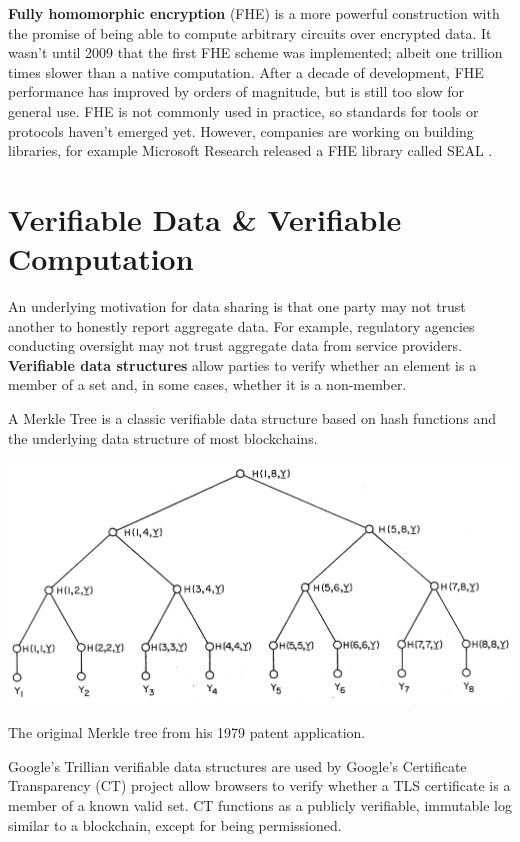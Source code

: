 \documentclass[nobib]{tufte-handout}
\begin{document}
\textbf{Fully homomorphic encryption} (FHE) is a more powerful construction with
the promise of being able to compute arbitrary circuits over encrypted data. It
wasn't until 2009 \cite{DBLP:conf/stoc/Gentry09} that the first FHE scheme was
implemented; albeit one trillion times slower than a native computation. After a
decade of development, FHE performance has improved by orders of magnitude, but
is still too slow for general use. FHE is not commonly used in practice, so
standards for tools or protocols haven't emerged yet. However, companies
are working on building libraries, for example Microsoft Research released a FHE library
called SEAL \cite{sealcrypto}.

\section{Verifiable Data \& Verifiable Computation}
\label{verifiable}

An underlying motivation for data sharing is that one party may not trust
another to honestly report aggregate data. For example, regulatory agencies
conducting oversight may not trust aggregate data from service providers.
\textbf{Verifiable data structures} allow parties to verify whether an element
is a member of a set and, in some cases, whether it is a non-member.

A Merkle Tree \cite{merkle1979} is a classic verifiable data structure based on
hash functions and the underlying data structure of most blockchains.

\begin{marginfigure} \includegraphics[width=\linewidth]{merkle} \caption{The
original Merkle tree from his 1979 patent application.} \label{fig:merkle}
\end{marginfigure}

Google’s Trillian \cite{google-trillian} verifiable data structures are used by
Google's Certificate Transparency (CT) project allow browsers to verify whether
a TLS certificate is a member of a known valid set. CT functions as a publicly
verifiable, immutable log similar to a blockchain, except for being
permissioned.
\end{document}

